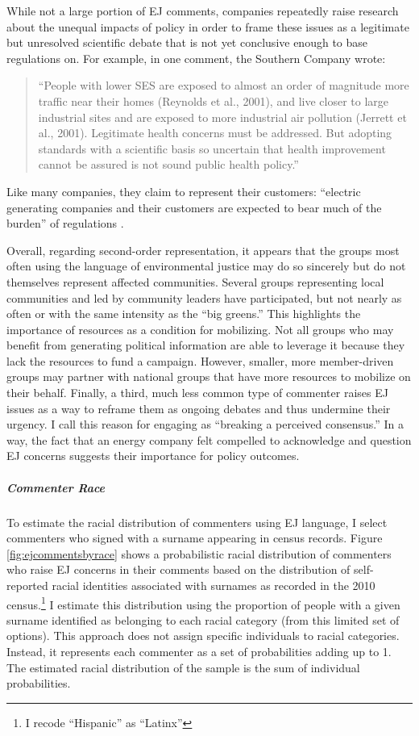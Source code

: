 \documentclass[
      12pt,
        ]{article}
\begin{document}
While not a large portion of EJ comments, companies repeatedly raise research about the unequal impacts of policy in order to frame these issues as a legitimate but unresolved scientific debate that is not yet conclusive enough to base regulations
on. For example, in one comment, the Southern Company wrote:

\begin{quote}
``People with lower SES are exposed to almost an order of magnitude
more traffic near their homes (Reynolds et al., 2001), and live closer
to large industrial sites and are exposed to more industrial air
pollution (Jerrett et al., 2001). Legitimate health concerns must be
addressed. But adopting standards with a scientific basis so uncertain
that health improvement cannot be assured is not sound public health
policy.''
\end{quote}

Like many companies, they claim to represent their customers:
``electric generating companies and their customers are expected to bear
much of the burden'' of regulations \citep{Hobson2004}.

Overall, regarding second-order representation, it appears that the groups
most often using the language of environmental justice may do so
sincerely but do not themselves represent affected communities. Several
groups representing local communities and led by community leaders have
participated, but not nearly as often or with the same intensity as the
``big greens.'' This highlights the importance of resources as a condition
for mobilizing. Not all groups who may benefit from generating political
information are able to leverage it because they lack the resources to
fund a campaign. However, smaller, more
member-driven groups may partner with national groups that have more resources to
mobilize on their behalf.
Finally, a third, much less common type of commenter raises EJ issues
as a way to reframe them as ongoing debates and thus undermine their
urgency. I call this reason for engaging as ``breaking a perceived
consensus.'' In a way, the fact that an energy company felt compelled to
acknowledge and question EJ concerns suggests their
importance for policy outcomes.

\hypertarget{commenter-race}{%
\subparagraph{Commenter Race}\label{commenter-race}}

To estimate the racial distribution of commenters
using EJ language, I select commenters who
signed with a
surname appearing in census records. Figure
\ref{fig:ejcommentsbyrace} shows a probabilistic racial
distribution of commenters who raise EJ concerns in
their comments based on the distribution of self-reported racial identities
associated with surnames as recorded in the 2010 census.\footnote{I recode ``Hispanic'' as ``Latinx''} I estimate this distribution using the proportion of people with a given surname identified as belonging to each racial
category (from this limited set of options). This approach does not
assign specific individuals to racial categories. Instead, it represents each commenter as a set of probabilities adding up to 1. The estimated racial distribution of the sample is the sum of individual probabilities.
\end{document}
